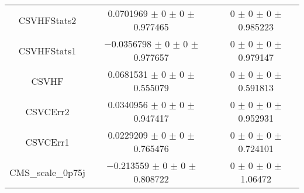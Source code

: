 \begin{table}
\begin{tabular}{ccc}
CSVHFStats2 	& \num{0.0701969} $\pm$ \num{0} $\pm$ \num{0} $\pm$ \num{0.977465} 	& \num{0} $\pm$ \num{0} $\pm$ \num{0} $\pm$ \num{0.985223}\\
CSVHFStats1 	& \num{-0.0356798} $\pm$ \num{0} $\pm$ \num{0} $\pm$ \num{0.977657} 	& \num{0} $\pm$ \num{0} $\pm$ \num{0} $\pm$ \num{0.979147}\\
CSVHF 	& \num{0.0681531} $\pm$ \num{0} $\pm$ \num{0} $\pm$ \num{0.555079} 	& \num{0} $\pm$ \num{0} $\pm$ \num{0} $\pm$ \num{0.591813}\\
CSVCErr2 	& \num{0.0340956} $\pm$ \num{0} $\pm$ \num{0} $\pm$ \num{0.947417} 	& \num{0} $\pm$ \num{0} $\pm$ \num{0} $\pm$ \num{0.952931}\\
CSVCErr1 	& \num{0.0229209} $\pm$ \num{0} $\pm$ \num{0} $\pm$ \num{0.765476} 	& \num{0} $\pm$ \num{0} $\pm$ \num{0} $\pm$ \num{0.724101}\\
CMS\_scale\_0p75j 	& \num{-0.213559} $\pm$ \num{0} $\pm$ \num{0} $\pm$ \num{0.808722} 	& \num{0} $\pm$ \num{0} $\pm$ \num{0} $\pm$ \num{1.06472}\\
\bottomrule
\end{tabular}
\end{table}
